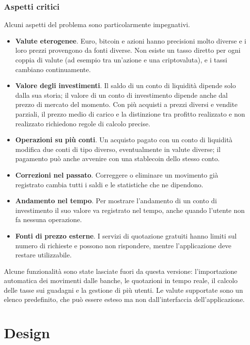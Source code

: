\documentclass[11pt,a4paper,openright]{report}
\begin{document}
\clearpage

\subsection*{Aspetti critici}

Alcuni aspetti del problema sono particolarmente impegnativi.
\begin{itemize}
  \item \textbf{Valute eterogenee}. Euro, bitcoin e azioni hanno precisioni molto diverse e i loro prezzi
  provengono da fonti diverse. Non esiste un tasso diretto per ogni coppia di valute (ad esempio tra
  un'azione e una criptovaluta), e i tassi cambiano continuamente.
  \item \textbf{Valore degli investimenti}. Il saldo di un conto di liquidità dipende solo dalla sua
  storia; il valore di un conto di investimento dipende anche dal prezzo di mercato del momento. Con più
  acquisti a prezzi diversi e vendite parziali, il prezzo medio di carico e la distinzione tra profitto
  realizzato e non realizzato richiedono regole di calcolo precise.
  \item \textbf{Operazioni su più conti}. Un acquisto pagato con un conto di liquidità modifica due conti
  di tipo diverso, eventualmente in valute diverse; il pagamento può anche avvenire con una stablecoin
  dello stesso conto.
  \item \textbf{Correzioni nel passato}. Correggere o eliminare un movimento già registrato cambia tutti i
  saldi e le statistiche che ne dipendono.
  \item \textbf{Andamento nel tempo}. Per mostrare l'andamento di un conto di investimento il suo valore
  va registrato nel tempo, anche quando l'utente non fa nessuna operazione.
  \item \textbf{Fonti di prezzo esterne}. I servizi di quotazione gratuiti hanno limiti sul numero di
  richieste e possono non rispondere, mentre l'applicazione deve restare utilizzabile.
\end{itemize}

Alcune funzionalità sono state lasciate fuori da questa versione: l'importazione automatica dei movimenti
dalle banche, le quotazioni in tempo reale, il calcolo delle tasse sui guadagni e la gestione di più
utenti. Le valute supportate sono un elenco predefinito, che può essere esteso ma non dall'interfaccia
dell'applicazione.

\chapter{Design}
\end{document}
